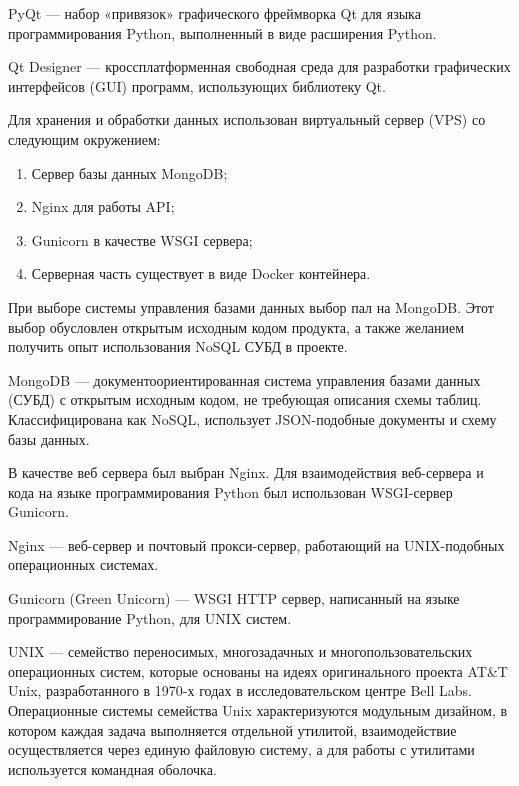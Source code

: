 \begin{definition}
   PyQt --- набор «привязок» графического фреймворка Qt для языка программирования Python, выполненный в виде расширения Python.
\end{definition}

\begin{definition}
   Qt Designer --- кроссплатформенная свободная среда для разработки графических интерфейсов (GUI) программ, использующих библиотеку Qt.
\end{definition}

Для хранения и обработки данных использован виртуальный сервер (VPS) со следующим окружением:
\begin{enumerate}
   \item Сервер базы данных MongoDB;
   \item Nginx для работы API;
   \item Gunicorn в качестве WSGI сервера;
   \item Серверная часть существует в виде Docker контейнера.
\end{enumerate}

При выборе системы управления базами данных выбор пал на MongoDB. Этот выбор обусловлен открытым исходным кодом продукта,
а также желанием получить опыт использования NoSQL СУБД в проекте.
\begin{definition}
    MongoDB --- документоориентированная система управления базами данных (СУБД) с открытым исходным кодом,
    не требующая описания схемы таблиц. Классифицирована как NoSQL, использует JSON-подобные документы и схему базы данных.
\end{definition}

В качестве веб сервера был выбран Nginx. Для взаимодействия веб-сервера и кода на языке программирования Python был использован WSGI-сервер Gunicorn.
\begin{definition}
   Nginx --- веб-сервер и почтовый прокси-сервер, работающий на UNIX-подобных операционных системах.
\end{definition}

\begin{definition}
    Gunicorn (Green Unicorn) --- WSGI HTTP сервер, написанный на языке программирование Python, для UNIX систем.
\end{definition}

\begin{definition}
    UNIX --- семейство переносимых, многозадачных и многопользовательских операционных систем, которые основаны на идеях оригинального проекта AT\&T Unix,
    разработанного в 1970-х годах в исследовательском центре Bell Labs. Операционные системы семейства Unix характеризуются модульным дизайном,
    в котором каждая задача выполняется отдельной утилитой, взаимодействие осуществляется через единую файловую систему,
    а для работы с утилитами используется командная оболочка.
\end{definition}

